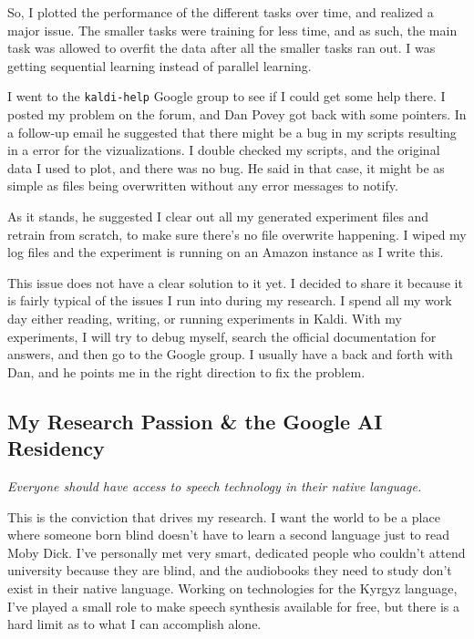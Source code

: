 \documentclass[12pt,a4paper]{article}
\begin{document}
So, I plotted the performance of the different tasks over time, and realized a major issue. The smaller tasks were training for less time, and as such, the main task was allowed to overfit the data after all the smaller tasks ran out. I was getting sequential learning instead of parallel learning.

I went to the \texttt{kaldi-help} Google group to see if I could get some help there. I posted my problem on the forum, and Dan Povey got back with some pointers. In a follow-up email he suggested that there might be a bug in my scripts resulting in a error for the vizualizations. I double checked my scripts, and the original data I used to plot, and there was no bug. He said in that case, it might be as simple as files being overwritten without any error messages to notify.

As it stands, he suggested I clear out all my generated experiment files and retrain from scratch, to make sure there's no file overwrite happening. I wiped my log files and the experiment is running on an Amazon instance as I write this.

This issue does not have a clear solution to it yet. I decided to share it because it is fairly typical of the issues I run into during my research. I spend all my work day either reading, writing, or running experiments in Kaldi. With my experiments, I will try to debug myself, search the official documentation for answers, and then go to the Google group. I usually have a back and forth with Dan, and he points me in the right direction to fix the problem. 







\subsection*{My Research Passion \& the Google AI Residency}

\begin{center}
\textit{Everyone should have access to speech technology in their native language.}
\end{center}

This is the conviction that drives my research. I want the world to be a place where someone born blind doesn't have to learn a second language just to read Moby Dick. I've personally met very smart, dedicated people who couldn't attend university because they are blind, and the audiobooks they need to study don't exist in their native language. Working on technologies for the Kyrgyz language, I've played a small role to make speech synthesis available for free, but there is a hard limit as to what I can accomplish alone.
\end{document}
